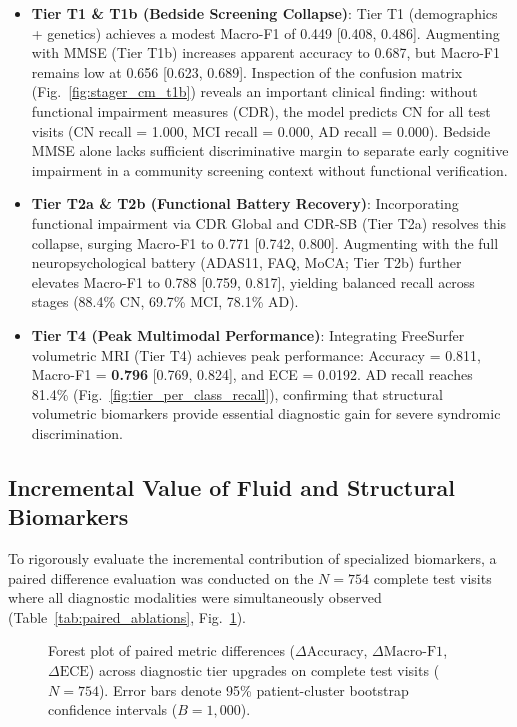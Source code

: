 \documentclass[11pt,a4paper]{article}
\begin{document}
\begin{itemize}
    \item \textbf{Tier T1 \& T1b (Bedside Screening Collapse)}: Tier T1 (demographics + genetics) achieves a modest Macro-F1 of 0.449 [0.408, 0.486]. Augmenting with MMSE (Tier T1b) increases apparent accuracy to 0.687, but Macro-F1 remains low at 0.656 [0.623, 0.689]. Inspection of the confusion matrix (Fig.~\ref{fig:stager_cm_t1b}) reveals an important clinical finding: without functional impairment measures (CDR), the model predicts CN for all test visits (CN recall = 1.000, MCI recall = 0.000, AD recall = 0.000). Bedside MMSE alone lacks sufficient discriminative margin to separate early cognitive impairment in a community screening context without functional verification.
    \item \textbf{Tier T2a \& T2b (Functional Battery Recovery)}: Incorporating functional impairment via CDR Global and CDR-SB (Tier T2a) resolves this collapse, surging Macro-F1 to 0.771 [0.742, 0.800]. Augmenting with the full neuropsychological battery (ADAS11, FAQ, MoCA; Tier T2b) further elevates Macro-F1 to 0.788 [0.759, 0.817], yielding balanced recall across stages (88.4\% CN, 69.7\% MCI, 78.1\% AD).
    \item \textbf{Tier T4 (Peak Multimodal Performance)}: Integrating FreeSurfer volumetric MRI (Tier T4) achieves peak performance: Accuracy = 0.811, Macro-F1 = \textbf{0.796} [0.769, 0.824], and ECE = 0.0192. AD recall reaches 81.4\% (Fig.~\ref{fig:tier_per_class_recall}), confirming that structural volumetric biomarkers provide essential diagnostic gain for severe syndromic discrimination.
\end{itemize}

\subsection{Incremental Value of Fluid and Structural Biomarkers}
\label{sec:results_ablations}
To rigorously evaluate the incremental contribution of specialized biomarkers, a paired difference evaluation was conducted on the $N = 754$ complete test visits where all diagnostic modalities were simultaneously observed (Table~\ref{tab:paired_ablations}, Fig.~\ref{fig:forest_paired_differences}).



\begin{figure}[t]
\centering
{}
\caption{Forest plot of paired metric differences ($\Delta\text{Accuracy}$, $\Delta\text{Macro-F1}$, $\Delta\text{ECE}$) across diagnostic tier upgrades on complete test visits ($N = 754$). Error bars denote 95\% patient-cluster bootstrap confidence intervals ($B = 1,000$).}
\label{fig:forest_paired_differences}
\end{figure}
\end{document}
